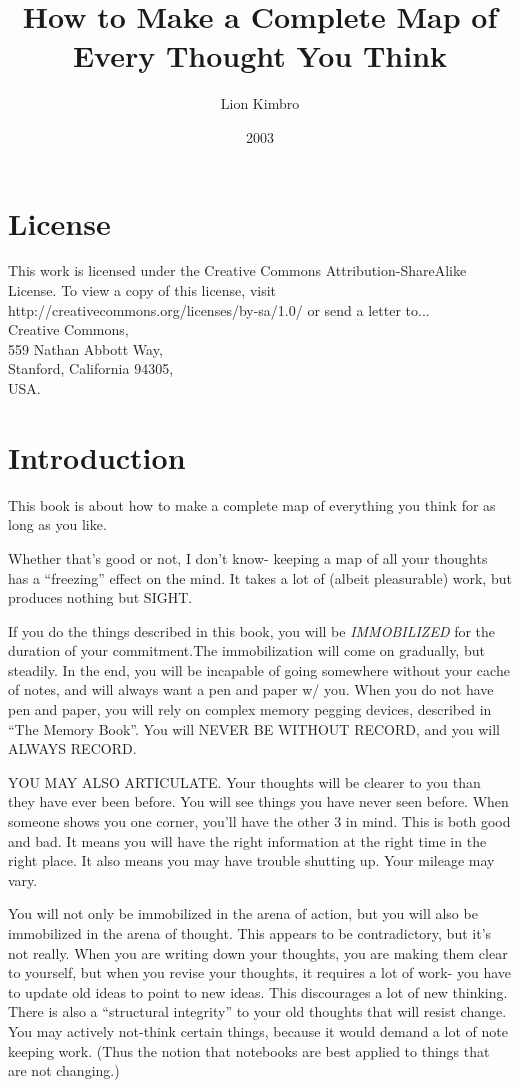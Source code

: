 \documentclass[oneside]{book}
\begin{document}
\frontmatter
\title{How to Make a Complete Map of Every Thought You Think}
\author{Lion Kimbro}
\date{2003}
\maketitle

\tableofcontents

\chapter{License}
This work is licensed under the Creative Commons
Attribution-ShareAlike License. To view a copy of this license, visit
\mbox{http://creativecommons.org/licenses/by-sa/1.0/} or send a letter to...\\
Creative Commons,\\
559 Nathan Abbott Way,\\
Stanford, California 94305, \\
USA.

\chapter{Introduction}
This book is about how to make a complete map of everything you think
for as long as you like.

Whether that's good or not, I don't know- keeping a map of all your
thoughts has a ``freezing'' effect on the mind. It takes a lot of
(albeit pleasurable) work, but produces nothing but SIGHT.

If you do the things described in this book, you will be \emph{IMMOBILIZED}
for the duration of your commitment.The immobilization will come on
gradually, but steadily. In the end, you will be incapable of going
somewhere without your cache of notes, and will always want a
pen and paper w/ you. When you do not have pen and paper, you will rely on
complex memory pegging devices, described in ``The Memory Book''. You
will NEVER BE WITHOUT RECORD, and you will ALWAYS RECORD.

YOU MAY ALSO ARTICULATE. Your thoughts will be clearer to you than
they have ever been before. You will see things you have never seen
before. When someone shows you one corner, you'll have the other 3 in
mind. This is both good and bad. It means you will have the right
information at the right time in the right place. It also means you
may have trouble shutting up. Your mileage may vary.

You will not only be immobilized in the arena of action, but you will
also be immobilized in the arena of thought. This appears to be
contradictory, but it's not really. When you are writing down your
thoughts, you are making them clear to yourself, but when you revise
your thoughts, it requires a lot of work- you have to update old
ideas to point to new ideas. This discourages a lot of new
thinking. There is also a ``structural integrity'' to your old thoughts
that will resist change. You may actively not-think certain things,
because it would demand a lot of note keeping work. (Thus the notion
that notebooks are best applied to things that are not changing.)
\end{document}
